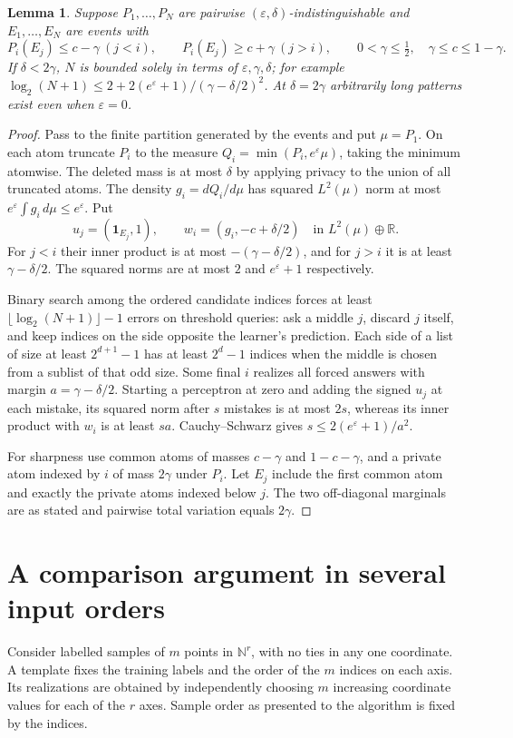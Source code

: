 \documentclass[11pt]{article}
\newtheorem{lemma}[theorem]{Lemma}
\newcommand{\N}{\mathbb N}
\begin{document}
\begin{lemma}\label{packing}
Suppose $P_1,\ldots,P_N$ are pairwise $(\varepsilon,\delta)$-indistinguishable and $E_1,\ldots,E_N$ are events with
\[
 P_i(E_j)\le c-\gamma\ (j<i),\qquad P_i(E_j)\ge c+\gamma\ (j>i),
 \qquad 0<\gamma\le\tfrac12,\quad \gamma\le c\le1-\gamma.
\]
If $\delta<2\gamma$, $N$ is bounded solely in terms of $\varepsilon,\gamma,\delta$; for example $\log_2(N+1)\le 2+2(e^\varepsilon+1)/(\gamma-\delta/2)^2$. At $\delta=2\gamma$ arbitrarily long patterns exist even when $\varepsilon=0$.
\end{lemma}
\begin{proof}
Pass to the finite partition generated by the events and put $\mu=P_1$. On each atom truncate $P_i$ to the measure $Q_i=\min(P_i,e^\varepsilon\mu)$, taking the minimum atomwise. The deleted mass is at most $\delta$ by applying privacy to the union of all truncated atoms. The density $g_i=dQ_i/d\mu$ has squared $L^2(\mu)$ norm at most $e^\varepsilon\int g_i\,d\mu\le e^\varepsilon$. Put
\[
 u_j=(\mathbf1_{E_j},1),\qquad w_i=(g_i,-c+\delta/2)
 \quad\text{in }L^2(\mu)\oplus\mathbb R .
\]
For $j<i$ their inner product is at most $-(\gamma-\delta/2)$, and for $j>i$ it is at least $\gamma-\delta/2$. The squared norms are at most $2$ and $e^\varepsilon+1$ respectively.

Binary search among the ordered candidate indices forces at least $\lfloor\log_2(N+1)\rfloor-1$ errors on threshold queries: ask a middle $j$, discard $j$ itself, and keep indices on the side opposite the learner's prediction. Each side of a list of size at least $2^{d+1}-1$ has at least $2^d-1$ indices when the middle is chosen from a sublist of that odd size. Some final $i$ realizes all forced answers with margin $a=\gamma-\delta/2$. Starting a perceptron at zero and adding the signed $u_j$ at each mistake, its squared norm after $s$ mistakes is at most $2s$, whereas its inner product with $w_i$ is at least $sa$. Cauchy--Schwarz gives $s\le2(e^\varepsilon+1)/a^2$.

For sharpness use common atoms of masses $c-\gamma$ and $1-c-\gamma$, and a private atom indexed by $i$ of mass $2\gamma$ under $P_i$. Let $E_j$ include the first common atom and exactly the private atoms indexed below $j$. The two off-diagonal marginals are as stated and pairwise total variation equals $2\gamma$.
\end{proof}

\section{A comparison argument in several input orders}
Consider labelled samples of $m$ points in $\N^r$, with no ties in any one coordinate. A template fixes the training labels and the order of the $m$ indices on each axis. Its realizations are obtained by independently choosing $m$ increasing coordinate values for each of the $r$ axes. Sample order as presented to the algorithm is fixed by the indices.
\end{document}

